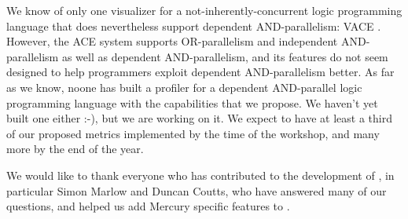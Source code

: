 We know of only one visualizer
for a not-inherently-concurrent logic programming language
that does nevertheless support dependent AND-parallelism: VACE \citep{vace}.
However, the ACE system supports
OR-parallelism and independent AND-parallelism
as well as dependent AND-parallelism,
and its features do not seem designed
to help programmers exploit dependent AND-parallelism better.
As far as we know, noone has built a profiler
for a dependent AND-parallel logic programming language
with the capabilities that we propose.
We haven't yet built one either :-),
but we are working on it.
We expect to have at least a third of our proposed metrics implemented
by the time of the workshop,
and many more by the end of the year.


We would like to thank everyone
who has contributed to the development of \tscope,
in particular Simon Marlow and Duncan Coutts,
who have answered many of our questions,
and helped us add Mercury specific features to \tscope.



